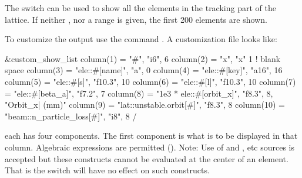{{{{{The  switch can be used to show all the elements in the tracking
part of the lattice. If neither , nor a range is given, the first
200 elements are shown.

To customize the output use the command . A
customization file looks like:
\begin{example}
  &custom_show_list
    column(1)  = "#",                      "i6",     6 
    column(2)  = "x",                      "x"       1   ! blank space
    column(3)  = "ele::#[name]",           "a",      0
    column(4)  = "ele::#[key]",            "a16",   16
    column(5)  = "ele::#[s]",              "f10.3", 10
    column(6)  = "ele::#[l]",              "f10.3", 10
    column(7)  = "ele::#[beta_a]",         "f7.2",   7
    column(8)  = "1e3 * ele::#[orbit_x]",  "f8.3",   8, "Orbit_x| (mm)" 
    column(9)  = "lat::unstable.orbit[#]", "f8.3",   8 
    column(10) = "beam::n_particle_loss[#]", "i8",   8 
  /
\end{example}
each  has four components. The first component is what is to be displayed in
that column. Algebraic expressions are permitted (). Note: Use of
 and , etc sources is accepted but these constructs cannot be
evaluated at the center of an element. That is the  switch will have no effect
on such constructs.

}}}}}
